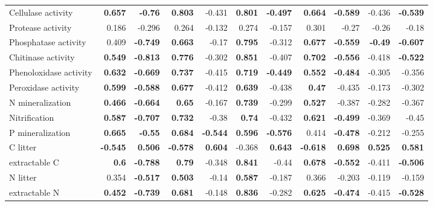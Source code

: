 \documentclass[10pt]{article}
\begin{document}
\begin{flushleft}
\begin{landscape}
\begin{table}[h!]
{\begin{tabular}{lrrrrrrrrrr}
  Cellulase activity & \textbf{ 0.657 } & \textbf{ -0.76 } & \textbf{ 0.803 } & -0.431 & \textbf{ 0.801 } & \textbf{ -0.497 } & \textbf{ 0.664 } & \textbf{ -0.589 } & -0.436 & \textbf{ -0.539 } \\ 
  Protease activity & 0.186 & -0.296 & 0.264 & -0.132 & 0.274 & -0.157 & 0.301 & -0.27 & -0.26 & -0.18 \\ 
  Phosphatase activity & 0.409 & \textbf{ -0.749 } & \textbf{ 0.663 } & -0.17 & \textbf{ 0.795 } & -0.312 & \textbf{ 0.677 } & \textbf{ -0.559 } & \textbf{ -0.49 } & \textbf{ -0.607 } \\ 
  Chitinase activity & \textbf{ 0.549 } & \textbf{ -0.813 } & \textbf{ 0.776 } & -0.302 & \textbf{ 0.851 } & -0.407 & \textbf{ 0.702 } & \textbf{ -0.556 } & -0.418 & \textbf{ -0.522 } \\ 
  Phenoloxidase activity & \textbf{ 0.632 } & \textbf{ -0.669 } & \textbf{ 0.737 } & -0.415 & \textbf{ 0.719 } & \textbf{ -0.449 } & \textbf{ 0.552 } & \textbf{ -0.484 } & -0.305 & -0.356 \\ 
  Peroxidase activity & \textbf{ 0.599 } & \textbf{ -0.588 } & \textbf{ 0.677 } & -0.412 & \textbf{ 0.639 } & -0.438 & \textbf{ 0.47 } & -0.435 & -0.173 & -0.302 \\ 
  N mineralization & \textbf{ 0.466 } & \textbf{ -0.664 } & \textbf{ 0.65 } & -0.167 & \textbf{ 0.739 } & -0.299 & \textbf{ 0.527 } & -0.387 & -0.282 & -0.367 \\ 
  Nitrification & \textbf{ 0.587 } & \textbf{ -0.707 } & \textbf{ 0.732 } & -0.38 & \textbf{ 0.74 } & -0.432 & \textbf{ 0.621 } & \textbf{ -0.499 } & -0.369 & -0.45 \\ 
  P mineralization & \textbf{ 0.665 } & \textbf{ -0.55 } & \textbf{ 0.684 } & \textbf{ -0.544 } & \textbf{ 0.596 } & \textbf{ -0.576 } & 0.414 & \textbf{ -0.478 } & -0.212 & -0.255 \\ 
  C litter & \textbf{ -0.545 } & \textbf{ 0.506 } & \textbf{ -0.578 } & \textbf{ 0.604 } & -0.368 & \textbf{ 0.643 } & \textbf{ -0.618 } & \textbf{ 0.698 } & \textbf{ 0.525 } & \textbf{ 0.581 } \\ 
  extractable C & \textbf{  0.6 } & \textbf{ -0.788 } & \textbf{ 0.79 } & -0.348 & \textbf{ 0.841 } & -0.44 & \textbf{ 0.678 } & \textbf{ -0.552 } & -0.411 & \textbf{ -0.506 } \\ 
  N litter & 0.354 & \textbf{ -0.517 } & \textbf{ 0.503 } & -0.14 & \textbf{ 0.587 } & -0.187 & 0.366 & -0.203 & -0.119 & -0.159 \\ 
  extractable N & \textbf{ 0.452 } & \textbf{ -0.739 } & \textbf{ 0.681 } & -0.148 & \textbf{ 0.836 } & -0.282 & \textbf{ 0.625 } & \textbf{ -0.474 } & -0.415 & \textbf{ -0.528 } \\ 

\end{tabular}}
\end{table}
\end{landscape}
\end{flushleft}
\end{document}
